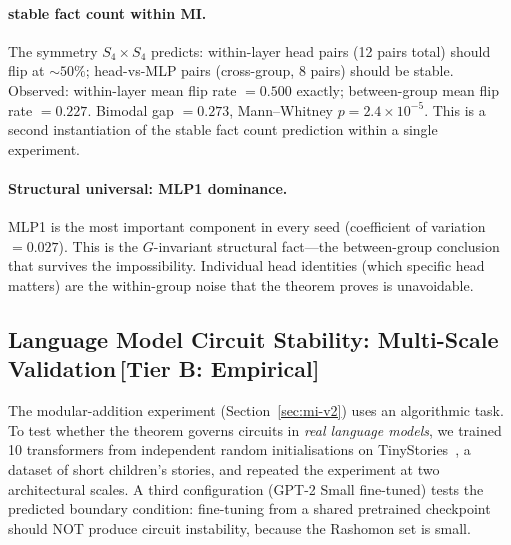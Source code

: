 \documentclass[11pt,a4paper]{article}
\begin{document}
\paragraph{stable fact count within MI.}
The symmetry $S_4 \times S_4$ predicts: within-layer head pairs (12 pairs total) should flip at $\sim 50\%$; head-vs-MLP pairs (cross-group, 8 pairs) should be stable.  Observed: within-layer mean flip rate $= 0.500$ exactly; between-group mean flip rate $= 0.227$.  Bimodal gap $= 0.273$, Mann--Whitney $p = 2.4 \times 10^{-5}$.  This is a second instantiation of the stable fact count prediction within a single experiment.

\paragraph{Structural universal: MLP1 dominance.}
MLP1 is the most important component in every seed (coefficient of variation $= 0.027$).  This is the $G$-invariant structural fact---the between-group conclusion that survives the impossibility.  Individual head identities (which specific head matters) are the within-group noise that the theorem proves is unavoidable.

\subsection{Language Model Circuit Stability: Multi-Scale Validation\,\textnormal{\normalsize[Tier B: Empirical]}}
\label{sec:tinystories}

The modular-addition experiment (Section~\ref{sec:mi-v2}) uses an algorithmic task.  To test whether the theorem governs circuits in \emph{real language models}, we trained 10 transformers from independent random initialisations on TinyStories~\cite{eldan2023tinystories}, a dataset of short children's stories, and repeated the experiment at two architectural scales.  A third configuration (GPT-2 Small fine-tuned) tests the predicted boundary condition: fine-tuning from a shared pretrained checkpoint should NOT produce circuit instability, because the Rashomon set is small.
\end{document}
